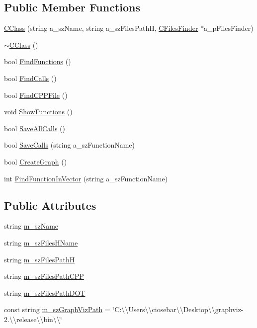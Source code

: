 \subsection*{Public Member Functions}
\begin{DoxyCompactItemize}
\item 
\hyperlink{class_c_class_a9d835b0d9c9cbc2abb5859f5839cc768}{C\+Class} (string a\+\_\+sz\+Name, string a\+\_\+sz\+Files\+Path\+H, \hyperlink{class_c_files_finder}{C\+Files\+Finder} $\ast$a\+\_\+p\+Files\+Finder)
\item 
\hyperlink{class_c_class_ab3bd712c48cc40f0e8b1cebe714dd2ed}{$\sim$\+C\+Class} ()
\item 
bool \hyperlink{class_c_class_a23774d2a60493cba0f87f2ccce1112e9}{Find\+Functions} ()
\item 
bool \hyperlink{class_c_class_a0a6b7022064d70e613755b46f71bfb3e}{Find\+Calls} ()
\item 
bool \hyperlink{class_c_class_a60f873762e2cf01154d819e963983f16}{Find\+C\+P\+P\+File} ()
\item 
void \hyperlink{class_c_class_aa4a34bb2e8c824dda17c8a12569de25a}{Show\+Functions} ()
\item 
bool \hyperlink{class_c_class_a1a1b258d491f553ba7db631a9a7ed9b5}{Save\+All\+Calls} ()
\item 
bool \hyperlink{class_c_class_aaae438dee1363c920c18bd96a29220fd}{Save\+Calls} (string a\+\_\+sz\+Function\+Name)
\item 
bool \hyperlink{class_c_class_a7fe0dadc365b5a396e5d14938061a699}{Create\+Graph} ()
\item 
int \hyperlink{class_c_class_a8c2b52a935357403b2599650f8d0cd37}{Find\+Function\+In\+Vector} (string a\+\_\+sz\+Function\+Name)
\end{DoxyCompactItemize}
\subsection*{Public Attributes}
\begin{DoxyCompactItemize}
\item 
string \hyperlink{class_c_class_ae7f5bac3dd30935df8d31dacacfea3e2}{m\+\_\+sz\+Name}
\item 
string \hyperlink{class_c_class_a15cee6cfe5a893a807799fb33d53db99}{m\+\_\+sz\+Files\+H\+Name}
\item 
string \hyperlink{class_c_class_a590754a9bdd5a6fc0104378da2fb7891}{m\+\_\+sz\+Files\+Path\+H}
\item 
string \hyperlink{class_c_class_a684985105ee38e9face97c886bcb86ce}{m\+\_\+sz\+Files\+Path\+C\+P\+P}
\item 
string \hyperlink{class_c_class_a4cf97b0cde501346ac139deaeab2573a}{m\+\_\+sz\+Files\+Path\+D\+O\+T}
\item 
const string \hyperlink{class_c_class_a8ee7eb6ac6ebd9f4b31324f9daeb07c2}{m\+\_\+sz\+Graph\+Viz\+Path} = \char`\"{}C\+:\textbackslash{}\textbackslash{}\+Users\textbackslash{}\textbackslash{}ciosebar\textbackslash{}\textbackslash{}\+Desktop\textbackslash{}\textbackslash{}graphviz-\/2.\textbackslash{}\textbackslash{}release\textbackslash{}\textbackslash{}bin\textbackslash{}\textbackslash{}\char`\"{}
\end{DoxyCompactItemize}
